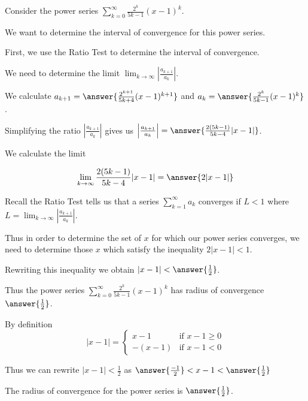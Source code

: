 \documentclass{ximera}
\author{Jim Talamo}
\begin{document}
\begin{exercise}
Consider the power series $\sum_{k=0}^{\infty} \frac{2^k}{5k-1}(x-1)^{k}$.

We want to determine the interval of convergence for this power series. 

First, we use the Ratio Test to determine the interval of convergence. 

We need to determine the limit $\lim_{k \to \infty} \left| \frac{a_{k+1}}{a_k}\right|$. 

We calculate $a_{k+1}=\answer{\frac{2^{k+1}}{5k+4}(x-1)^{k+1}}$ and $a_k=\answer{ \frac{2^k}{5k-1}(x-1)^k}$. 

\begin{exercise}

Simplifying the ratio $\left|\frac{a_{k+1}}{a_k}\right|$ gives us $\left|\frac{a_{k+1}}{a_k}\right|=\answer{\frac{2(5k-1)}{5k-4} |x-1|}$.


\begin{exercise}

We calculate the limit

\[
\lim_{k \to \infty}  \frac{2(5k-1)}{5k-4} |x-1| =\answer{ 2|x-1|}
\]

\begin{exercise}

Recall the Ratio Test tells us that a series $\sum^{\infty}_{k=1} a_k$ converges if $L <1$ where $L=\lim_{k \to \infty}\left| \frac{a_{k+1}}{a_k}\right|$. 

Thus in order to determine the set of $x$ for which our power series converges, we need to determine those $x$ which satisfy 
the inequality $2|x-1| <1$. 

Rewriting this inequality we obtain $|x-1|< \answer{\frac{1}{2}}$. 

Thus the  power series $\sum_{k=0}^{\infty} \frac{2^k}{5k-1}(x-1)^{k}$ has radius of convergence $\answer{\frac{1}{2}}$.

\begin{exercise}

By definition 
\[
|x-1|=\begin{cases}
  x-1 &\text{if $x-1\geq 0$} \\
 -(x-1) &\text{if $x-1 < 0$}
\end{cases}
\]

Thus we can rewrite $|x-1| < \frac{1}{2}$ as $\answer{\frac{-1}{2}} < x-1 < \answer{\frac{1}{2}}$ 


The radius of convergence for the power series is $\answer{\frac{1}{2}}$.


\end{exercise}
\end{exercise}
\end{exercise}
\end{exercise}
\end{exercise}
\end{document}

